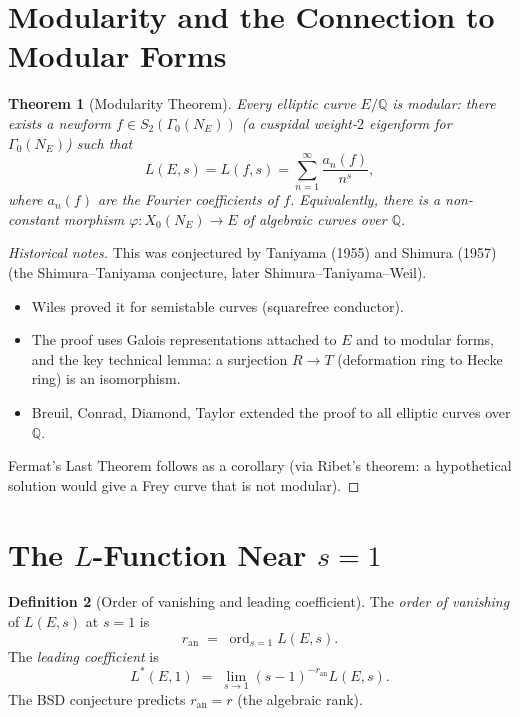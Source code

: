 \documentclass[12pt,a4paper]{amsart}
\newtheorem{theorem}{Theorem}[section]
\theoremstyle{definition}
\newtheorem{definition}[theorem]{Definition}
\newcommand{\Q}{\mathbb{Q}}
\DeclareMathOperator{\ord}{ord}
\begin{document}
\section{Modularity and the Connection to Modular Forms}

\begin{theorem}[Modularity Theorem]
\label{thm:modularity}
Every elliptic curve $E/\Q$ is \emph{modular}: there exists a newform
$f \in S_2(\Gamma_0(N_E))$ (a cuspidal weight-$2$ eigenform for $\Gamma_0(N_E)$)
such that
\[
  L(E,s) = L(f,s) = \sum_{n=1}^{\infty} \frac{a_n(f)}{n^s},
\]
where $a_n(f)$ are the Fourier coefficients of $f$.
Equivalently, there is a non-constant morphism
$\varphi: X_0(N_E) \to E$ of algebraic curves over $\Q$.
\end{theorem}

\begin{proof}[Historical notes]
This was conjectured by Taniyama (1955) and Shimura (1957)
(the Shimura--Taniyama conjecture, later Shimura--Taniyama--Weil).
\begin{itemize}
  \item Wiles \cite{Wiles1995} proved it for semistable curves (squarefree conductor).
  \item The proof uses Galois representations attached to $E$ and to modular forms,
    and the key technical lemma: a surjection $R \to T$ (deformation ring
    to Hecke ring) is an isomorphism.
  \item Breuil, Conrad, Diamond, Taylor \cite{BCDT2001} extended the
    proof to all elliptic curves over $\Q$.
\end{itemize}
Fermat's Last Theorem follows as a corollary (via Ribet's theorem: a
hypothetical solution would give a Frey curve that is not modular).
\end{proof}

\section{The \texorpdfstring{$L$}{L}-Function Near \texorpdfstring{$s=1$}{s=1}}

\begin{definition}[Order of vanishing and leading coefficient]
\label{def:order_vanishing}
The \emph{order of vanishing} of $L(E,s)$ at $s=1$ is
\[
  r_{\mathrm{an}} \;=\; \ord_{s=1} L(E,s).
\]
The \emph{leading coefficient} is
\[
  L^*(E,1) \;=\; \lim_{s \to 1} (s-1)^{-r_{\mathrm{an}}} L(E,s).
\]
The BSD conjecture predicts $r_{\mathrm{an}} = r$ (the algebraic rank).
\end{definition}
\end{document}
